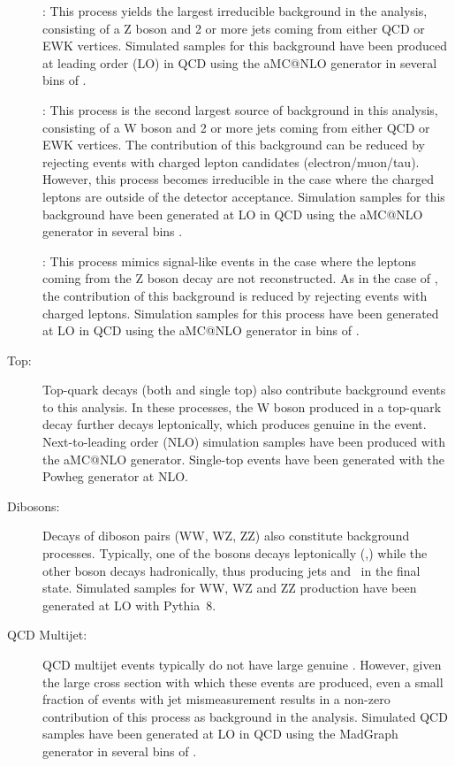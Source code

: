\begin{description}
\item[\Zvvjets]: This process yields the largest irreducible background in the analysis, consisting of a Z boson and 2 or more
jets coming from either QCD or EWK vertices. Simulated samples for this background have been produced at leading
order (LO) in QCD using the aMC@NLO generator in several bins of \Ht.

\item[\Wjets]: This process is the second largest source of background in this analysis, consisting of a W boson and 2 or more 
jets coming from either QCD or EWK vertices. The contribution of this background can be reduced by rejecting events with 
charged lepton candidates (electron/muon/tau). 
However, this process becomes irreducible in the case where the charged leptons are outside of the detector acceptance.
Simulation samples for this background have been generated at LO in QCD using the aMC@NLO generator in several bins \Ht.

\item[\Zlljets]: This process mimics signal-like events in the case where the leptons coming from the Z boson decay are 
not reconstructed. As in the case of \Wlv, the contribution of this background is reduced by rejecting events with charged leptons. 
Simulation samples for this process have been generated at LO in QCD using the aMC@NLO generator in bins of \Ht.

\item[Top:] Top-quark decays (both \ttbar and single top) also contribute background events to this analysis. 
In these processes, the W boson produced in a top-quark decay further decays leptonically, which produces genuine \ptmiss in the event. 
Next-to-leading order (NLO) \ttbar simulation samples have been produced with the aMC@NLO generator. 
Single-top events have been generated with the Powheg generator at NLO.

\item[Dibosons:] Decays of diboson pairs (WW, WZ, ZZ) also constitute background processes. 
Typically, one of the bosons decays leptonically (\Wlv,\Zvv) while the other boson decays hadronically, thus producing jets and \ptmiss~in the final state. 
Simulated samples for WW, WZ and ZZ production have been generated at LO with Pythia~8.

\item[QCD Multijet:] QCD multijet events typically do not have large genuine \ptmiss. 
However, given the large cross section with which these events are produced, even a small fraction of events with 
jet mismeasurement results in a non-zero contribution of this process as background in the analysis. 
Simulated QCD samples have been generated at LO in QCD using the MadGraph generator in several bins of \Ht.

\end{description}

